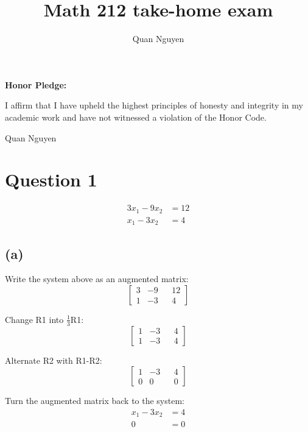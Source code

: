 \documentclass[10pt]{article}
\begin{document}
\title{Math 212 take-home exam}
\author{Quan Nguyen}
\maketitle

\bigskip
\noindent
{\bf Honor Pledge:}
\par
\noindent I affirm that I have upheld the highest principles of honesty and integrity in my academic work and have not witnessed a violation of the Honor Code.
\par
\bigskip
\noindent Quan Nguyen

\bigskip
\noindent

\section*{Question 1}
\begin{align*}
    3x_1 - 9x_2 &= 12 \\
    x_1 - 3x_2 &= 4
\end{align*}

\subsection*{(a)}
\noindent Write the system above as an augmented matrix:
\begin{equation*}
    \begin{bmatrix}
        3 & -9 && 12 \\
        1 & -3 && 4
    \end{bmatrix}
\end{equation*}

\noindent Change R1 into $\frac{1}{3}$R1:
\begin{equation*}
    \begin{bmatrix}
        1 & -3 && 4 \\
        1 & -3 && 4
    \end{bmatrix}
\end{equation*}

\noindent Alternate R2 with R1-R2:
\begin{equation*}
    \begin{bmatrix}
        1 & -3 && 4 \\
        0 & 0 && 0
    \end{bmatrix}
\end{equation*}

\noindent Turn the augmented matrix back to the system:
\begin{align*}
    x_1 - 3x_2 &= 4 \\
    0 &= 0
\end{align*}
\end{document}

